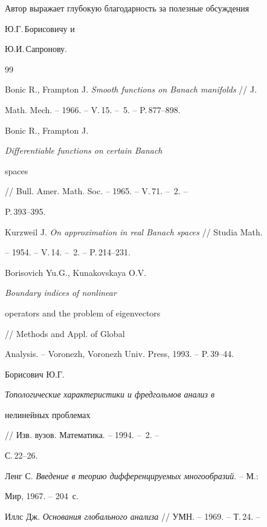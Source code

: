 Автор выражает глубокую благодарность за полезные обсуждения


Ю.Г.\,Борисовичу и \linebreak




Ю.И.\,Сапронову.








\begin{thebibliography}{99}







Bonic R., Frampton J. {\em Smooth functions on Banach manifolds} // J.


Math. Mech. -- 1966. -- V.\,15. -- \No\,5. -- P.\,877--898.




Bonic R., Frampton J. {\em Differentiable functions on certain Banach


spaces} // Bull. Amer. Math. Soc. -- 1965. -- V.\,71. -- \No\,2. --


P.\,393--395.




Kurzweil J. {\em On approximation in real Banach spaces} // Studia Math.


-- 1954. -- V.\,14. -- \No\,2. -- P.\,214--231.




Borisovich Yu.G., Kunakovskaya O.V. {\em Boundary indices of nonlinear


operators and the problem of eigenvectors} // Methods and Appl. of Global


Analysis. -- Voronezh, Voronezh Univ. Press, 1993. -- P.\,39--44.




Борисович Ю.Г. {\em Топологические характеристики и фредгольмов анализ в


нелинейных проблемах} // Изв. вузов. Математика. -- 1994. -- \No\,2. --


С.\,22--26.




Ленг С. {\em Введение в теорию дифференцируемых многообразий}. -- М.:


Мир, 1967. -- 204~с.




Иллс Дж. {\em Основания глобального анализа} // УМН. -- 1969. -- Т.\,24. --



\end{thebibliography}
